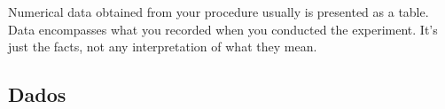 

Numerical data obtained from your procedure usually is presented as a table. Data encompasses what you recorded when you conducted the experiment. It's just the facts, not any interpretation of what they mean.


\subsection{Dados}
\label{dados}




  